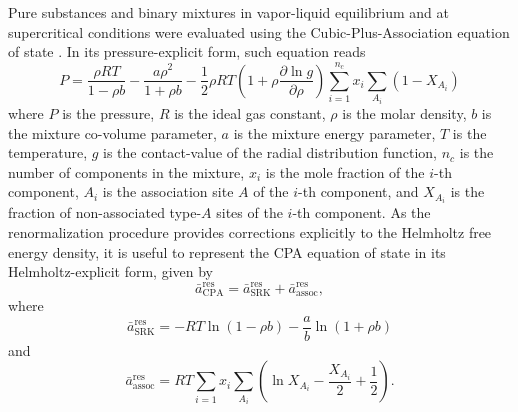 \documentclass[preprint,12pt,3p]{elsarticle}
\begin{document}
Pure substances and binary mixtures in vapor-liquid equilibrium and at supercritical conditions were evaluated using the Cubic-Plus-Association equation of state \citep{kontogeorgis1996equation}.
In its pressure-explicit form, such equation reads
\begin{equation} \label{eq:pressure_cpa}
P = \frac{\rho RT}{1-\rho b}-\frac{a \rho^2}{1+\rho b}-\frac{1}{2} \rho RT \left(1+\rho\frac{\partial \ln g}{\partial \rho}\right)\sum_{i=1}^{n_c} x_{i} \sum_{A_{i}}(1-X_{A_{i}})
\end{equation}
where $P$ is the pressure,
$R$ is the ideal gas constant,
$\rho$ is the molar density,
$b$ is the mixture co-volume parameter,
$a$ is the mixture energy parameter,
$T$ is the temperature,
$g$ is the contact-value of the radial distribution function,
$n_c$ is the number of components in the mixture,
$x_{i}$ is the mole fraction of the $i$-th component,
$A_{i}$ is the association site $A$ of the $i$-th component, and
$X_{A_{i}}$ is the fraction of non-associated type-$A$ sites of the $i$-th component.
As the renormalization procedure provides corrections explicitly to the Helmholtz free energy density, it is useful to represent the CPA equation of state in its Helmholtz-explicit form, given by
\begin{equation} \label{eq:helm_res_cpa}
\bar{a}_\text{CPA}^\text{res} =\bar{a}_\text{SRK}^\text{res} + \bar{a}_\text{assoc}^\text{res},
\end{equation}
where
\begin{equation} \label{eq:helm_res_srk}
\bar{a}_\text{SRK}^\text{res} = -RT\ln(1-\rho b)-\frac{a}{b}\ln(1+\rho b)   
\end{equation}
and
\begin{equation} \label{eq:helm_res_assoc}
\bar{a}_\text{assoc}^\text{res} = RT\sum_{i=1} x_{i} \sum_{A_{i}}\left(\ln X_{A_{i}} - \frac{X_{A_{i}}}{2} + \frac{1}{2}\right).
\end{equation}
\end{document}
